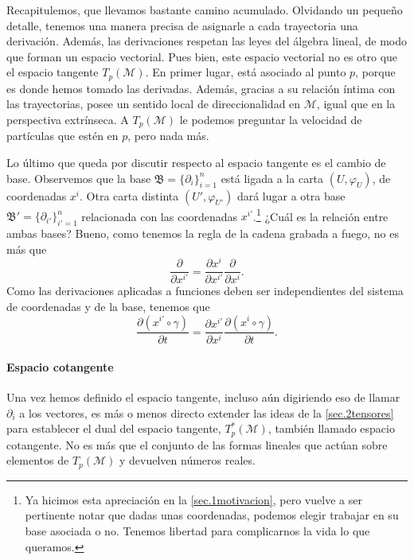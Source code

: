 Recapitulemos, que llevamos bastante camino acumulado. Olvidando un pequeño detalle, tenemos una manera precisa de asignarle a cada trayectoria una derivación. Además, las derivaciones respetan las leyes del álgebra lineal, de modo que forman un espacio vectorial. Pues bien, este espacio vectorial no es otro que el espacio tangente \(T_p(\mathcal{M})\). En primer lugar, está asociado al punto \(p\), porque es donde hemos tomado las derivadas. Además, gracias a su relación íntima con las trayectorias, posee un sentido local de direccionalidad en \(\mathcal{M}\), igual que en la perspectiva extrínseca. A \(T_p(\mathcal{M})\) le podemos preguntar la velocidad de partículas que estén en \(p\), pero nada más.

Lo último que queda por discutir respecto al espacio tangente es el cambio de base. Observemos que la base \(\mathfrak{B} = \{\partial_i\}_{i=1}^n\) está ligada a la carta \((U, \varphi_U)\), de coordenadas \(x^i\). Otra carta distinta \((U', \varphi_{U'})\) dará lugar a otra base \(\mathfrak{B}' = \{\partial_{i'}\}_{i'=1}^n\) relacionada con las coordenadas \(x^{i'}\).\footnote{Ya hicimos esta apreciación en la \cref{sec.1motivacion}, pero vuelve a ser pertinente notar que dadas unas coordenadas, podemos elegir trabajar en su base asociada o no. Tenemos libertad para complicarnos la vida lo que queramos.} ¿Cuál es la relación entre ambas bases? Bueno, como tenemos la regla de la cadena grabada a fuego, no es más que 
\begin{equation}
    \frac{\partial}{\partial x^{i'}} = \frac{\partial x^i}{\partial x^{i'}}\frac{\partial}{\partial x^{i}}.
\end{equation}
Como las derivaciones aplicadas a funciones deben ser independientes del sistema de coordenadas y de la base, tenemos que 
\begin{equation}
    \frac{\partial \left(x^{i'}\circ\gamma\right)}{\partial t} = 
    \frac{\partial x^{i'}}{\partial x^i}
    \frac{\partial \left(x^{i}\circ\gamma\right)}{\partial t}.
\end{equation}

\paragraph{Espacio cotangente} Una vez hemos definido el espacio tangente, incluso aún digiriendo eso de llamar \(\partial_i\) a los vectores, es más o menos directo extender las ideas de la \cref{sec.2tensores} para establecer el dual del espacio tangente, \(T^*_p(\mathcal{M})\), también llamado espacio cotangente. No es más que el conjunto de las formas lineales que actúan sobre elementos de \(T_p(\mathcal{M})\) y devuelven números reales. 

